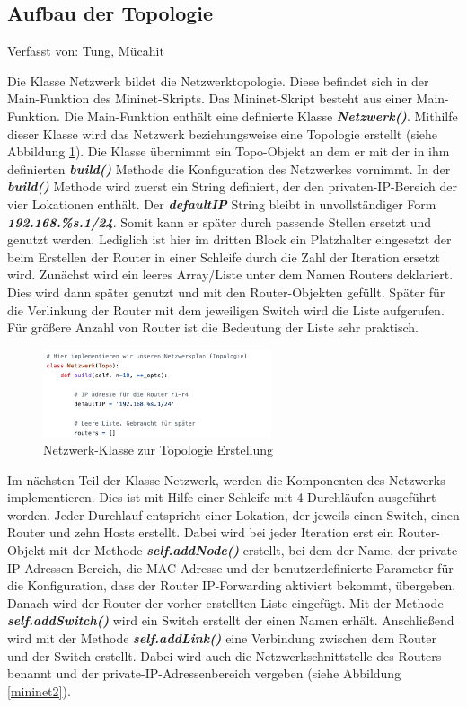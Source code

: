 \documentclass[fontsize=12pt,paper=a4,open=any,parskip=half,
  twoside=false,toc=listof,toc=bibliography,fleqn,leqno,
  captions=nooneline,captions=tableabove,british]{scrbook}
\begin{document}
\subsection{Aufbau der Topologie}
{\tiny Verfasst von: Tung, Mücahit\par}
Die Klasse Netzwerk bildet die Netzwerktopologie. Diese befindet sich in der Main-Funktion des Mininet-Skripts. Das Mininet-Skript besteht aus einer Main-Funktion. Die Main-Funktion enthält eine definierte Klasse \textit{\textbf{Netzwerk()}}. Mithilfe dieser Klasse wird das Netzwerk beziehungsweise eine Topologie erstellt (siehe Abbildung \ref{mininet1}). Die Klasse übernimmt ein Topo-Objekt an dem er mit der in ihm definierten \textit{\textbf{build()}} Methode die Konfiguration des Netzwerkes vornimmt. In der \textit{\textbf{build()}} Methode wird zuerst ein String definiert, der den privaten-IP-Bereich der vier Lokationen enthält. Der \textit{\textbf{defaultIP}} String bleibt in unvollständiger Form \textit{\textbf{192.168.\%s.1/24}}. Somit kann er später durch passende Stellen ersetzt und genutzt werden. Lediglich ist hier im dritten Block ein Platzhalter eingesetzt der beim Erstellen der Router in einer Schleife durch die Zahl der Iteration ersetzt wird. Zunächst wird ein leeres Array/Liste unter dem Namen Routers deklariert. Dies wird dann später genutzt und mit den Router-Objekten gefüllt. Später für die Verlinkung der Router mit dem jeweiligen Switch wird die Liste aufgerufen. Für größere Anzahl von Router ist die Bedeutung der Liste sehr praktisch.

\begin{figure}[H]
 \centering
 \includegraphics[width=0.6\textwidth]{Bilder/mininet1}
 \captionsetup{justification=centering,margin=1cm}
 \caption{Netzwerk-Klasse zur Topologie Erstellung}
 \label{mininet1}
\end{figure}

Im nächsten Teil der Klasse Netzwerk, werden die Komponenten des Netzwerks implementieren. Dies ist mit Hilfe einer Schleife mit 4 Durchläufen ausgeführt worden. Jeder Durchlauf entspricht einer Lokation, der jeweils einen Switch, einen Router und zehn Hosts erstellt. Dabei wird bei jeder Iteration erst ein Router-Objekt mit der Methode \textit{\textbf{self.addNode()}} erstellt, bei dem der Name, der private IP-Adressen-Bereich, die MAC-Adresse und der benutzerdefinierte Parameter für die Konfiguration, dass der Router IP-Forwarding aktiviert bekommt, übergeben. Danach wird der Router der vorher erstellten Liste eingefügt. Mit der Methode \textit{\textbf{self.addSwitch()}} wird ein Switch erstellt der einen Namen erhält. Anschließend wird mit der Methode \textit{\textbf{self.addLink()}} eine Verbindung zwischen dem Router und der Switch erstellt. Dabei wird auch die Netzwerkschnittstelle des Routers benannt und der private-IP-Adressenbereich vergeben  (siehe Abbildung \ref{mininet2}).
\end{document}
